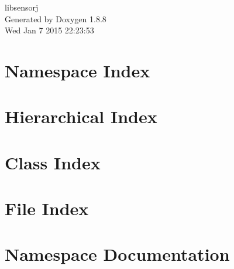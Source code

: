 \documentclass[twoside]{book}
\newcommand{\+}{\discretionary{\mbox{\scriptsize$\hookleftarrow$}}{}{}}
\newcommand{\clearemptydoublepage}{%
  \newpage{\pagestyle{empty}\cleardoublepage}%
}
\begin{document}
\hypersetup{pageanchor=false,
             bookmarks=true,
             bookmarksnumbered=true,
             pdfencoding=unicode
            }
\begin{titlepage}
\vspace*{7cm}
\begin{center}%
{\Large libsensorj }\\
\vspace*{1cm}
{\large Generated by Doxygen 1.8.8}\\
\vspace*{0.5cm}
{\small Wed Jan 7 2015 22:23:53}\\
\end{center}
\end{titlepage}
\clearemptydoublepage
\tableofcontents
\clearemptydoublepage
{}
\hypersetup{pageanchor=true}

\chapter{Namespace Index}

\chapter{Hierarchical Index}

\chapter{Class Index}

\chapter{File Index}

\chapter{Namespace Documentation}


















\end{document}
